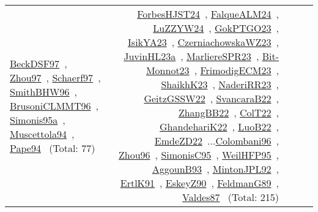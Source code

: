 {\begin{longtable}{p{3cm}r>{\raggedright\arraybackslash}p{6cm}>{\raggedright\arraybackslash}p{6cm}>{\raggedright\arraybackslash}p{8cm}}
\href{../works/BeckDSF97.pdf}{BeckDSF97}~\cite{BeckDSF97}, \href{../works/Zhou97.pdf}{Zhou97}~\cite{Zhou97}, \href{../works/Schaerf97.pdf}{Schaerf97}~\cite{Schaerf97}, \href{../works/SmithBHW96.pdf}{SmithBHW96}~\cite{SmithBHW96}, \href{../works/BrusoniCLMMT96.pdf}{BrusoniCLMMT96}~\cite{BrusoniCLMMT96}, \href{../works/Simonis95a.pdf}{Simonis95a}~\cite{Simonis95a}, \href{../works/Muscettola94.pdf}{Muscettola94}~\cite{Muscettola94}, \href{../works/Pape94.pdf}{Pape94}~\cite{Pape94} (Total: 77) & \href{../works/ForbesHJST24.pdf}{ForbesHJST24}~\cite{ForbesHJST24}, \href{../works/FalqueALM24.pdf}{FalqueALM24}~\cite{FalqueALM24}, \href{../works/LuZZYW24.pdf}{LuZZYW24}~\cite{LuZZYW24}, \href{../works/GokPTGO23.pdf}{GokPTGO23}~\cite{GokPTGO23}, \href{../works/IsikYA23.pdf}{IsikYA23}~\cite{IsikYA23}, \href{../works/CzerniachowskaWZ23.pdf}{CzerniachowskaWZ23}~\cite{CzerniachowskaWZ23}, \href{../works/JuvinHL23a.pdf}{JuvinHL23a}~\cite{JuvinHL23a}, \href{../works/MarliereSPR23.pdf}{MarliereSPR23}~\cite{MarliereSPR23}, \href{../works/Bit-Monnot23.pdf}{Bit-Monnot23}~\cite{Bit-Monnot23}, \href{../works/FrimodigECM23.pdf}{FrimodigECM23}~\cite{FrimodigECM23}, \href{../works/ShaikhK23.pdf}{ShaikhK23}~\cite{ShaikhK23}, \href{../works/NaderiRR23.pdf}{NaderiRR23}~\cite{NaderiRR23}, \href{../works/GeitzGSSW22.pdf}{GeitzGSSW22}~\cite{GeitzGSSW22}, \href{../works/SvancaraB22.pdf}{SvancaraB22}~\cite{SvancaraB22}, \href{../works/ZhangBB22.pdf}{ZhangBB22}~\cite{ZhangBB22}, \href{../works/ColT22.pdf}{ColT22}~\cite{ColT22}, \href{../works/GhandehariK22.pdf}{GhandehariK22}~\cite{GhandehariK22}, \href{../works/LuoB22.pdf}{LuoB22}~\cite{LuoB22}, \href{../works/EmdeZD22.pdf}{EmdeZD22}~\cite{EmdeZD22}...\href{../works/Colombani96.pdf}{Colombani96}~\cite{Colombani96}, \href{../works/Zhou96.pdf}{Zhou96}~\cite{Zhou96}, \href{../works/SimonisC95.pdf}{SimonisC95}~\cite{SimonisC95}, \href{../works/WeilHFP95.pdf}{WeilHFP95}~\cite{WeilHFP95}, \href{../works/AggounB93.pdf}{AggounB93}~\cite{AggounB93}, \href{../works/MintonJPL92.pdf}{MintonJPL92}~\cite{MintonJPL92}, \href{../works/ErtlK91.pdf}{ErtlK91}~\cite{ErtlK91}, \href{../works/EskeyZ90.pdf}{EskeyZ90}~\cite{EskeyZ90}, \href{../works/FeldmanG89.pdf}{FeldmanG89}~\cite{FeldmanG89}, \href{../works/Valdes87.pdf}{Valdes87}~\cite{Valdes87} (Total: 215)\\

\end{longtable}}
